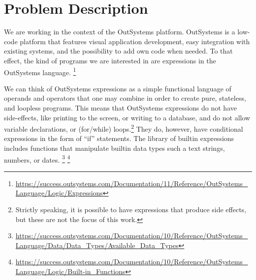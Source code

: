 \section{Problem Description}
\label{sec:problem-description}

We are working in the context of the OutSystems platform. OutSystems is a
low-code platform that features visual application development, easy integration
with existing systems, and the possibility to add own code when needed. To that
effect, the kind of programs we are interested in are expressions in the
OutSystems language.
\footnote{\url{https://success.outsystems.com/Documentation/11/Reference/OutSystems_Language/Logic/Expressions}}

We can think of OutSystems expressions as a simple functional language of
operands and operators that one may combine in order to create pure, stateless,
and loopless programs. This means that OutSystems expressions do not have
side-effects, like printing to the screen, or writing to a database, and do not
allow variable declarations, or (for/while) loops.\footnote{Strictly speaking, it is possible to have expressions that produce side effects, but these are not the focus of this work.}
They do, however, have conditional expressions in the form of ``if'' statements.
The library of builtin expressions includes functions that manipulate builtin
data types such a text strings, numbers, or dates.
\footnote{\url{https://success.outsystems.com/Documentation/10/Reference/OutSystems_Language/Data/Data_Types/Available_Data_Types}}%
\footnote{\url{https://success.outsystems.com/Documentation/10/Reference/OutSystems_Language/Logic/Built-in_Functions}}

